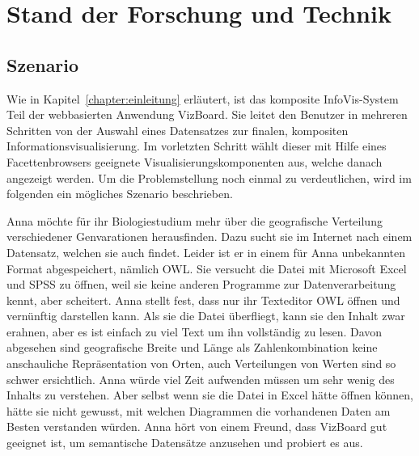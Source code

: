 \documentclass[
	headsepline,
	footsepline,
	fontsize=12pt,
	bibliography=totoc
]{scrbook}
\begin{document}

\chapter{Stand der Forschung und Technik}
\label{chapter:standderforschung}

\section{Szenario}
\label{section:szenario}


Wie in Kapitel~\ref{chapter:einleitung} erläutert, ist das komposite InfoVis-System Teil der webbasierten Anwendung VizBoard. Sie leitet den Benutzer in mehreren Schritten von der Auswahl eines Datensatzes zur finalen, kompositen Informationsvisualisierung. Im vorletzten Schritt wählt dieser mit Hilfe eines Facettenbrowsers geeignete Visualisierungskomponenten aus, welche danach angezeigt werden. Um die Problemstellung noch einmal zu verdeutlichen, wird im folgenden ein mögliches Szenario beschrieben.

Anna möchte für ihr Biologiestudium mehr über die geografische Verteilung verschiedener Genvarationen herausfinden. Dazu sucht sie im Internet nach einem Datensatz, welchen sie auch findet. 
Leider ist er in einem für Anna unbekannten Format abgespeichert, nämlich OWL. Sie versucht die Datei mit Microsoft Excel und SPSS zu öffnen, weil sie keine anderen Programme zur Datenverarbeitung kennt, aber scheitert. Anna stellt fest, dass nur ihr Texteditor OWL öffnen und vernünftig darstellen kann. Als sie die Datei überfliegt, kann sie den Inhalt zwar erahnen, aber es ist einfach zu viel Text um ihn vollständig zu lesen. Davon abgesehen sind geografische Breite und Länge als Zahlenkombination keine anschauliche Repräsentation von Orten, auch Verteilungen von Werten sind so schwer ersichtlich. Anna würde viel Zeit aufwenden müssen um sehr wenig des Inhalts zu verstehen. Aber selbst wenn sie die Datei in Excel hätte öffnen können, hätte sie nicht gewusst, mit welchen Diagrammen die vorhandenen Daten am Besten verstanden würden. Anna hört von einem Freund, dass VizBoard gut geeignet ist, um semantische Datensätze anzusehen und probiert es aus.
\end{document}
